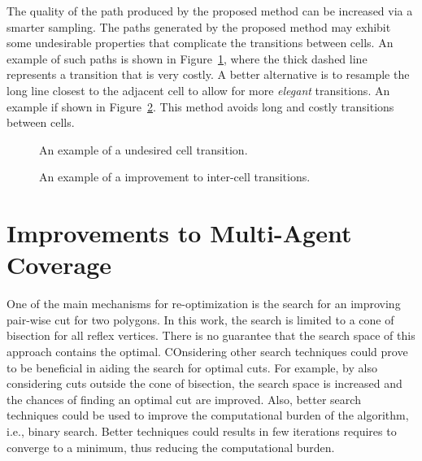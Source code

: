 \documentclass[../main.tex]{subfiles}
\begin{document}
The quality of the path produced by the proposed method can be increased via a smarter sampling. The paths generated by the proposed method may exhibit some undesirable properties  that complicate the transitions between cells. An example of such paths is shown in Figure~\ref{fig:cell_transition}, where the thick dashed line represents a transition that is very costly. A better alternative is to resample the long line closest to the adjacent cell to allow for more \emph{elegant} transitions. An example if shown in Figure~\ref{fig:cell_transition_better}. This method avoids long and costly transitions between cells.

\begin{figure}
	\centering
	
	\caption{An example of a undesired cell transition.}
	\label{fig:cell_transition}
\end{figure}

\begin{figure}
	\centering
	
	\caption{An example of a improvement to inter-cell transitions.}
	\label{fig:cell_transition_better}
\end{figure}


\section{Improvements to Multi-Agent Coverage}
\label{section:future_multi}

One of the main mechanisms for re-optimization is the search for an improving pair-wise cut for two polygons. In this work, the search is limited to a cone of bisection for all reflex vertices. There is no guarantee that the search space of this approach contains the optimal. COnsidering other search techniques could prove to be beneficial in aiding the search for optimal cuts. For example, by also considering cuts outside the cone of bisection, the search space is increased and the chances of finding an optimal cut are improved. Also, better search techniques could be used to improve the computational burden of the algorithm, i.e., binary search. Better techniques could results in few iterations requires to converge to a minimum, thus reducing the computational burden.
\end{document}
